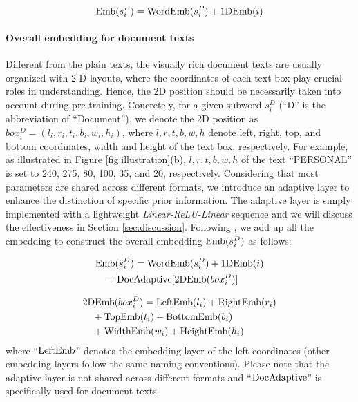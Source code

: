 \documentclass[11pt]{article}
\begin{document}
\begin{equation}
{\rm Emb}(s_{i}^{P}) = {\rm WordEmb}(s_{i}^{P}) + {\rm 1DEmb}(i)
\label{eq:plain}
\end{equation}

\paragraph{Overall embedding for document texts} Different from the plain texts, the visually rich document texts are usually organized with 2-D layouts, where the coordinates of each text box play crucial roles in understanding. Hence, the 2D position should be necessarily taken into account during pre-training. Concretely, for a given subword $s_{i}^{D}$ (``D'' is the abbreviation of ``Document''), we denote the 2D position as $box_{i}^{D}=(l_{i}, r_{i}, t_{i}, b_{i}, w_{i}, h_{i})$, where $l, r, t, b, w, h$ denote left, right, top, and bottom coordinates, width and height of the text box, respectively. For example, as illustrated in Figure \ref{fig:illustration}(b), $l, r, t, b, w, h$ of the text ``PERSONAL'' is set to 240, 275, 80, 100, 35, and 20, respectively. Considering that most parameters are shared across different formats, we introduce an adaptive layer to enhance the distinction of specific prior information. The adaptive layer is simply implemented with a lightweight \textit{Linear-ReLU-Linear} sequence and we will discuss the effectiveness in Section \ref{sec:discussion}. Following \cite{xu2020layoutlm,xu2020layoutlmv2}, we add up all the embedding to construct the overall embedding ${\rm Emb}(s_{i}^{D})$ as follows:

\begin{equation}
\begin{aligned}
& {\rm Emb}(s_{i}^{D}) = {\rm WordEmb}(s_{i}^{D}) + {\rm 1DEmb}(i) \\ 
& \quad + {\rm DocAdaptive}[{\rm 2DEmb}(box_{i}^{D})]
\end{aligned}
\label{eq:doc}
\end{equation}

\begin{equation}
\begin{aligned}
& {\rm 2DEmb}(box_{i}^{D}) = {\rm LeftEmb}(l_{i}) + {\rm RightEmb}(r_{i}) \\ 
& \quad + {\rm TopEmb}(t_{i}) + {\rm BottomEmb}(b_{i}) \\
& \quad + {\rm WidthEmb}(w_{i}) + {\rm HeightEmb}(h_{i})
\end{aligned}
\label{eq:doc2}
\end{equation}
where ``${\rm LeftEmb}$'' denotes the embedding layer of the left coordinates (other embedding layers follow the same naming conventions). Please note that the  adaptive layer is not shared across different formats and ``${\rm DocAdaptive}$'' is specifically used for document texts.
\end{document}
